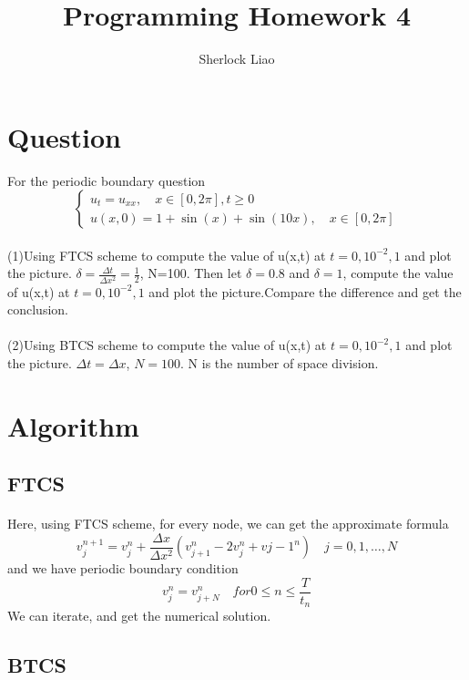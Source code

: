 \documentclass[UTF8]{article}
\author {Sherlock Liao}
\title {Programming Homework 4 }
\begin{document}
\maketitle
\section{Question}
For the periodic boundary question
$$
\begin{cases}
u_{t}=u_{xx}, \quad x \in [0,2\pi], t \geqslant 0 \\
u(x,0)=1+\sin(x)+\sin(10x), \quad x \in [0,2\pi]
\end{cases}
$$
\paragraph{}
(1)Using FTCS scheme to compute the value of u(x,t) at $t=0, 10^{-2}, 1$ and plot the picture. $\delta = \frac{\Delta t}{\Delta x^{2}} = \frac{1}{2}$, \quad N=100. Then let $\delta = 0.8$ and $\delta = 1$, compute the value of u(x,t) at $t=0, 10^{-2}, 1$ and plot the picture.Compare the difference and get the conclusion.
\paragraph{}
(2)Using BTCS scheme to compute the value of u(x,t) at $t=0, 10^{-2}, 1$ and plot the picture. $\Delta t = \Delta x$, $N = 100$. N is the number of space division.
\section{Algorithm}
\subsection{FTCS}
\paragraph{}
Here, using FTCS scheme, for every node, we can get the approximate formula
$$
v_{j}^{n+1} = v_{j}^{n} + \frac{\Delta x}{\Delta x^{2}}(v_{j+1}^{n} - 2v_{j}^{n} + v{j-1}^{n}) \quad j = 0,1,\dots,N
$$
and we have periodic boundary condition
$$
v_{j}^{n} = v_{j+N}^{n} \quad for 0  \leq n \leq \frac{T}{t_{n}}
$$
We can iterate, and get the numerical solution.
\subsection{BTCS}
\end{document}
